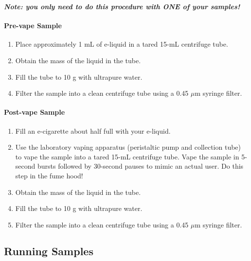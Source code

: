 \documentclass[]{tufte-book}
\providecommand{\tightlist}{%
  \setlength{\itemsep}{0pt}\setlength{\parskip}{0pt}}
\begin{document}
\textbf{\emph{Note: you only need to do this procedure with ONE of your samples!}}

\hypertarget{pre-vape-sample}{%
\paragraph{\texorpdfstring{\textbf{Pre-vape Sample}}{Pre-vape Sample}}\label{pre-vape-sample}}

\begin{enumerate}
\def\labelenumi{\arabic{enumi}.}
\tightlist
\item
  Place approximately 1 mL of e-liquid in a tared 15-mL centrifuge tube.
\item
  Obtain the mass of the liquid in the tube.
\item
  Fill the tube to 10 g with ultrapure water.
\item
  Filter the sample into a clean centrifuge tube using a 0.45 \(\mu\)m syringe filter.
\end{enumerate}

\hypertarget{post-vape-sample}{%
\paragraph{\texorpdfstring{\textbf{Post-vape Sample}}{Post-vape Sample}}\label{post-vape-sample}}

\begin{enumerate}
\def\labelenumi{\arabic{enumi}.}
\tightlist
\item
  Fill an e-cigarette about half full with your e-liquid.
\item
  Use the laboratory vaping apparatus (peristaltic pump and collection tube) to vape the sample into a tared 15-mL centrifuge tube. Vape the sample in 5-second bursts followed by 30-second pauses to mimic an actual user. Do this step in the fume hood!
\item
  Obtain the mass of the liquid in the tube.
\item
  Fill the tube to 10 g with ultrapure water.
\item
  Filter the sample into a clean centrifuge tube using a 0.45 \(\mu\)m syringe filter.
\end{enumerate}

\hypertarget{running-samples}{%
\subsection{Running Samples}\label{running-samples}}
\end{document}
